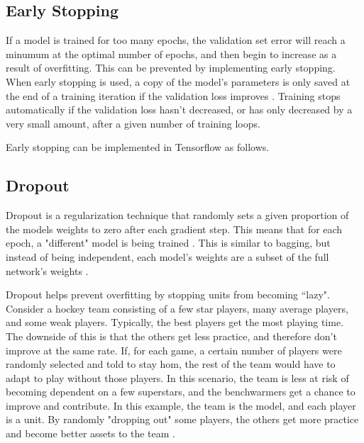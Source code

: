 \documentclass{article}
\begin{document}
\subsection{Early Stopping} %

If a model is trained for too many epochs, the validation set error will reach a minumum at the optimal number of epochs, and then begin to increase as a result of overfitting. This can be prevented by implementing early stopping. When early stopping is used, a copy of the model's parameters is only saved at the end of a training iteration if the validation loss improves \cite{Goodfellow-et-al-2016}. Training stops automatically if the validation loss hasn't decreased, or has only decreased by a very small amount, after a given number of training loops.

Early stopping can be implemented in Tensorflow as follows.



\subsection{Dropout} %

Dropout is a regularization technique that randomly sets a given proportion of the models weights to zero after each gradient step. This means that for each epoch, a "different" model is being trained \cite{Srivastava14}. This is similar to bagging, but instead of being independent, each model's weights are a subset of the full network's weights \cite{Goodfellow-et-al-2016}.

Dropout helps prevent overfitting by stopping units from becoming ``lazy". Consider a hockey team consisting of a few star players, many average players, and some weak players. Typically, the best players get the most playing time. The downside of this is that the others get less practice, and therefore don't improve at the same rate. If, for each game, a certain number of players were randomly selected and told to stay hom, the rest of the team would have to adapt to play without those players. In this scenario, the team is less at risk of becoming dependent on a few superstars, and the benchwarmers get a chance to improve and contribute. In this example, the team is the model, and each player is a unit. By randomly "dropping out" some players, the others get more practice and become better assets to the team \cite{hands-on-ml}.
\end{document}
